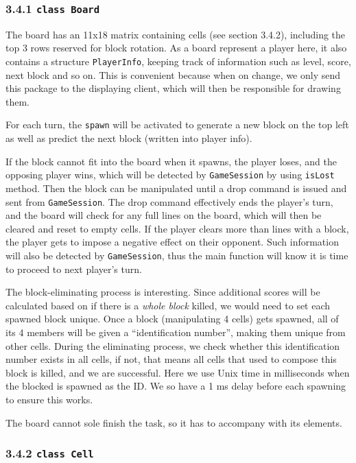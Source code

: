 \documentclass[
]{article}
\begin{document}
\hypertarget{class-board}{%
\subsubsection{\texorpdfstring{3.4.1
\texttt{class\ Board}}{3.4.1 class Board}}\label{class-board}}

The board has an 11x18 matrix containing cells (see section 3.4.2),
including the top 3 rows reserved for block rotation. As a board
represent a player here, it also contains a structure
\texttt{PlayerInfo}, keeping track of information such as level, score,
next block and so on. This is convenient because when on change, we only
send this package to the displaying client, which will then be
responsible for drawing them.

For each turn, the \texttt{spawn} will be activated to generate a new
block on the top left as well as predict the next block (written into
player info).

If the block cannot fit into the board when it spawns, the player loses,
and the opposing player wins, which will be detected by
\texttt{GameSession} by using \texttt{isLost} method. Then the block can
be manipulated until a drop command is issued and sent from
\texttt{GameSession}. The drop command effectively ends the player's
turn, and the board will check for any full lines on the board, which
will then be cleared and reset to empty cells. If the player clears more
than lines with a block, the player gets to impose a negative effect on
their opponent. Such information will also be detected by
\texttt{GameSession}, thus the main function will know it is time to
proceed to next player's turn.

The block-eliminating process is interesting. Since additional scores
will be calculated based on if there is a \emph{whole block} killed, we
would need to set each spawned block unique. Once a block (manipulating
4 cells) gets spawned, all of its 4 members will be given a
``identification number'', making them unique from other cells. During
the eliminating process, we check whether this identification number
exists in all cells, if not, that means all cells that used to compose
this block is killed, and we are successful. Here we use Unix time in
milliseconds when the blocked is spawned as the ID. We so have a 1 ms
delay before each spawning to ensure this works.

The board cannot sole finish the task, so it has to accompany with its
elements.

\hypertarget{class-cell}{%
\subsubsection{\texorpdfstring{3.4.2
\texttt{class\ Cell}}{3.4.2 class Cell}}\label{class-cell}}
\end{document}
